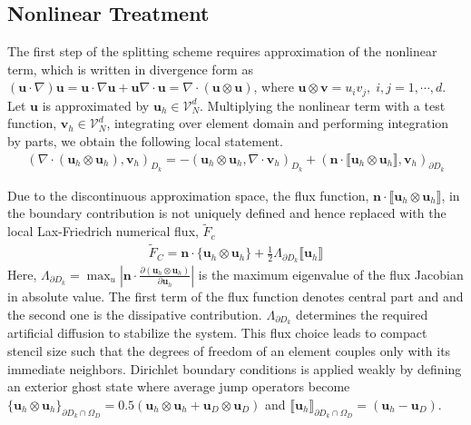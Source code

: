 \documentclass[11pt,a4paper,twoside]{article}
\begin{document}
	
	\subsection{Nonlinear Treatment}
	
	The first step of the splitting scheme requires approximation of the nonlinear term, which is written in divergence form as  $ \left(\mathbf{u}\cdot\nabla\right)\mathbf{u}  = \mathbf{u}\cdot\nabla \mathbf{u} + \mathbf{u}\nabla\cdot\mathbf{u} = \nabla\cdot\left(   \mathbf{u}\otimes\mathbf{u}\right)$, where $ \mathbf{u}\otimes\mathbf{v} = u_i v_j , \;i,j = 1,\cdots,d $. Let $ \mathbf{u} $  is approximated by $ \mathbf{u}_h \in \mathcal{V}_N^d$. Multiplying the nonlinear term with a test function, $ \mathbf{v}_h \in \mathcal{V}_N^d $, integrating over element  domain and performing integration by parts, we obtain the following local statement.
	\begin{equation}
	\label{Eq.NonlinearTermDiscretization_1}
	\begin{aligned}
	\left(\nabla\cdot\left(  \mathbf{u}_h\otimes\mathbf{u}_h\right),\mathbf{v}_h\right)_{D_{k}} =
	-\left(   \mathbf{u}_h\otimes\mathbf{u}_h, \nabla\cdot\mathbf{v}_h \right)_{D_{k}} 
	+\left(  \mathbf{n}\cdot   \llbracket \mathbf{u}_h \otimes\mathbf{u}_h\rrbracket, \mathbf{v}_h\right)_{\partial D_k}
	\end{aligned}
	\end{equation}
	
	
	Due to the discontinuous approximation space, the flux function, $\mathbf{n}\cdot   \llbracket \mathbf{u}_h \otimes\mathbf{u}_h\rrbracket $, in the boundary contribution is not uniquely defined and hence replaced  with the local Lax-Friedrich numerical flux, $ \tilde{F}_c $
	\begin{equation}
	\label{Eq.NonlinearTermDiscretization_2}
	\begin{aligned}
	\tilde{F}_{C} = \mathbf{n} \cdot  \lbrace \mathbf{u}_h \otimes\mathbf{u}_h \rbrace  + \frac{1}{2}\Lambda_{\partial D_k} \llbracket  \mathbf{u}_h  \rrbracket 
	\end{aligned}
	\end{equation}
	Here, $ \Lambda_{\partial D_k} = \max_u | \mathbf{n}\cdot\frac{\partial \left(\mathbf{u}_h \otimes\mathbf{u}_h\right) }{\partial \mathbf{u}_h}|$ is the maximum eigenvalue of the flux Jacobian in absolute value. The first term of the flux function denotes central part and and the second one is the dissipative contribution.  $ \Lambda_{\partial D_k} $ determines the required artificial diffusion to stabilize the system. This flux choice leads to compact stencil size such that the degrees of freedom of an element couples only with its immediate neighbors. Dirichlet boundary conditions is applied weakly by defining an exterior ghost state where average jump operators become $ \{  \mathbf{u}_h \otimes\mathbf{u}_h\}_{\partial D_k \cap \Omega_D} =0.5 \left( \mathbf{u}_h \otimes\mathbf{u}_h +  \mathbf{u}_D \otimes\mathbf{u}_D\right)  $ and $ \llbracket  \mathbf{u}_h \rrbracket_{\partial D_k \cap \Omega_D} =\left( \mathbf{u}_h -  \mathbf{u}_D \right)  $. 
	
\end{document}
